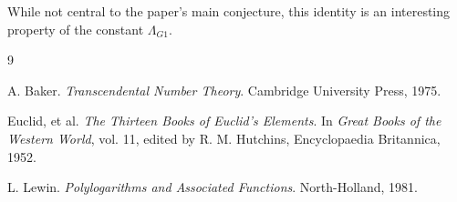 \documentclass{amsart}
\theoremstyle{plain}
\theoremstyle{definition}
\theoremstyle{remark}
\newcommand{\LambdaG}{\Lambda_{G1}}
\begin{document}
While not central to the paper's main conjecture, this identity is an interesting property of the constant $\LambdaG$.

\begin{thebibliography}{9}

A. Baker. \textit{Transcendental Number Theory}. Cambridge University Press, 1975. 

Euclid, et al. \textit{The Thirteen Books of Euclid's Elements}. In \textit{Great Books of the Western World}, vol. 11, edited by R. M. Hutchins, Encyclopaedia Britannica, 1952. 

L. Lewin. \textit{Polylogarithms and Associated Functions}. North-Holland, 1981. 

\end{thebibliography}
\end{document}
